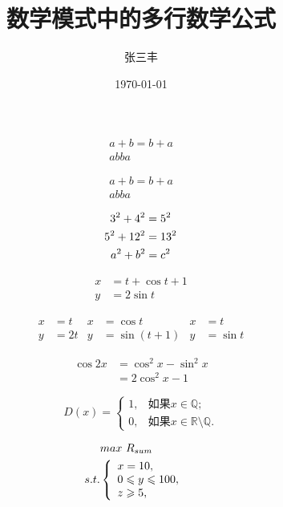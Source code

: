 \documentclass{article}
\title{数学模式中的多行数学公式}
\author{张三丰}
\date{\today}
\begin{document}
	\maketitle
	\begin{gather}
		a + b = b + a \\
		ab ba
	\end{gather}
	
	\begin{gather*}
	a + b = b + a \\
	ab ba
	\end{gather*}
	
	\begin{gather}
	3^2 + 4^2 = 5^2 \notag \\
	5^2 + 12^2 = 13^2 \notag \\
	a^2 + b^2 =c^2\notag
	\end{gather}
	
	\begin{align}
	x &= t+ \cos t + 1 \\
	y &= 2\sin t
	\end{align}
	
	\begin{align*}
	x &= t & x &= \cos t & x & =t \\
	y &= 2t & y & = \sin (t+1) & y &= \sin t
	\end{align*}
	
	\begin{equation}
		\begin{split}
		\cos 2x &= \cos^2 x - \sin^2 x \\
		&= 2\cos^2 x - 1
		\end{split}
	\end{equation}
	
	\begin{equation}
		D(x) = \begin{cases}
		1,& \text{如果} x \in \mathbb{Q}; \\
		0,& \text{如果} x \in \mathbb{R}\setminus\mathbb{Q}.
		\end{cases}
	\end{equation}
	
	\begin{equation}
	\begin{split}
	& max \ R_{sum} \\
	s.t. &\left\{
		\begin{array}{lr}
		x=10, &  \\
		0 \leqslant y \leqslant 100, & \\
		z\geqslant5, &  
		\end{array}
	\right.
	\end{split}
	\notag
	\end{equation}
\end{document}
